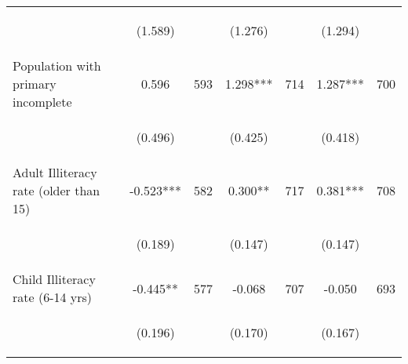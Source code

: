 \begin{tabular}{lcccccc}
\vspace{4pt} &  \begin{footnotesize}(1.589)\end{footnotesize}   & &
			    \begin{footnotesize}(1.276)\end{footnotesize}   & &
			    \begin{footnotesize}(1.294)\end{footnotesize}   &
			     \\          

Population with primary incomplete   &  0.596   &  593  &   1.298***  &  714 &  1.287***  &  700   \\

\vspace{4pt} &  \begin{footnotesize}(0.496)\end{footnotesize}   & &
			    \begin{footnotesize}(0.425)\end{footnotesize}   & &
			    \begin{footnotesize}(0.418)\end{footnotesize}   &
			     \\          

Adult Illiteracy rate (older than 15)   &  -0.523***   &  582  &   0.300**  &  717 &  0.381***  &  708   \\

\vspace{4pt} &  \begin{footnotesize}(0.189)\end{footnotesize}   & &
			    \begin{footnotesize}(0.147)\end{footnotesize}   & &
			    \begin{footnotesize}(0.147)\end{footnotesize}   &
			     \\          

Child Illiteracy rate (6-14 yrs)   &  -0.445**   &  577  &   -0.068  &  707 &  -0.050  &  693   \\

\vspace{4pt} &  \begin{footnotesize}(0.196)\end{footnotesize}   & &
			    \begin{footnotesize}(0.170)\end{footnotesize}   & &
			    \begin{footnotesize}(0.167)\end{footnotesize}   &
			     \\          


\end{tabular}
